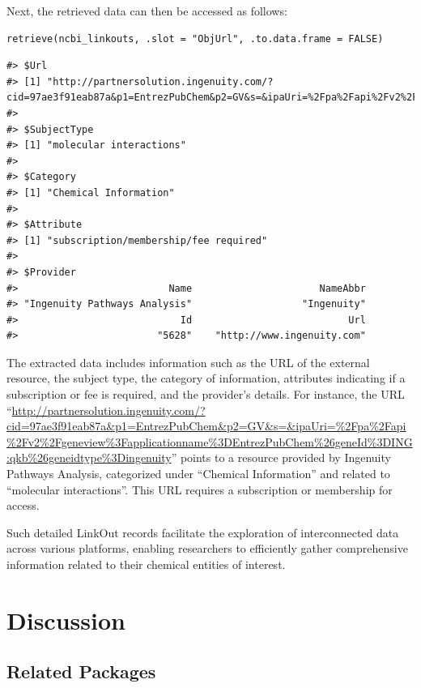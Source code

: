 Next, the retrieved data can then be accessed as follows:

\begin{verbatim}
retrieve(ncbi_linkouts, .slot = "ObjUrl", .to.data.frame = FALSE)
\end{verbatim}

\begin{verbatim}
#> $Url
#> [1] "http://partnersolution.ingenuity.com/?cid=97ae3f91eab87a&p1=EntrezPubChem&p2=GV&s=&ipaUri=%2Fpa%2Fapi%2Fv2%2Fgeneview%3Fapplicationname%3DEntrezPubChem%26geneId%3DING:qkb%26geneidtype%3Dingenuity"
#> 
#> $SubjectType
#> [1] "molecular interactions"
#> 
#> $Category
#> [1] "Chemical Information"
#> 
#> $Attribute
#> [1] "subscription/membership/fee required"
#> 
#> $Provider
#>                          Name                      NameAbbr 
#> "Ingenuity Pathways Analysis"                   "Ingenuity" 
#>                            Id                           Url 
#>                        "5628"    "http://www.ingenuity.com"
\end{verbatim}

The extracted data includes information such as the URL of the external resource, the subject type, the category of information, attributes indicating if a subscription or fee is required, and the provider's details. For instance, the URL ``\url{http://partnersolution.ingenuity.com/?cid=97ae3f91eab87a\&p1=EntrezPubChem\&p2=GV\&s=\&ipaUri=\%2Fpa\%2Fapi\%2Fv2\%2Fgeneview\%3Fapplicationname\%3DEntrezPubChem\%26geneId\%3DING:qkb\%26geneidtype\%3Dingenuity}'' points to a resource provided by Ingenuity Pathways Analysis, categorized under ``Chemical Information'' and related to ``molecular interactions''. This URL requires a subscription or membership for access.

Such detailed LinkOut records facilitate the exploration of interconnected data across various platforms, enabling researchers to efficiently gather comprehensive information related to their chemical entities of interest.

\hypertarget{discussion}{%
\section{Discussion}\label{discussion}}

\hypertarget{related-packages}{%
\subsection{Related Packages}\label{related-packages}}

